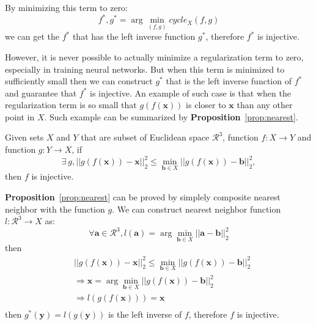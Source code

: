 By minimizing this term to zero:
\begin{equation}
f^*,g^* = \arg\min_{(f,g)} cycle_X(f,g)
\end{equation}
we can get the $f^*$ that has the left inverse function $g^*$, therefore $f^*$ is injective. 

However, it is never possible to actually minimize a regularization term to zero, especially in training neural networks. But when this term is minimized to sufficiently small then we can construct $g^*$ that is the left inverse function of $f^*$ and guarantee that $f^*$ is injective. An example of such case is that when the regularization term is so small that $g(f(\mathbf{x}))$ is closer to $\mathbf{x}$ than any other point in $X$. Such example can be summarized by \textbf{Proposition}~\ref{prop:nearest}.

\begin{m_prop}
	\label{prop:nearest}
	Given sets $X$ and $Y$ that are subset of Euclidean space $\mathcal{R}^3$, function $f:X \rightarrow Y$  and function $g:Y \rightarrow X$, if
	\begin{equation}
	\exists~g, || g(f(\mathbf{x})) - \mathbf{x} ||_2^2 \leq \min_{\mathbf{b} \in X}|| g(f(\mathbf{x})) - \mathbf{b} ||_2^2,
	\end{equation}
	then $f$ is injective.
\end{m_prop}

\textbf{Proposition}~\ref{prop:nearest} can be proved by simplely composite nearest neighbor with the function $g$. We can construct nearest neighbor function $l: \mathcal{R}^3 \rightarrow X $ as:
\begin{equation}
\forall \mathbf{a} \in \mathcal{R}^3, l(\mathbf{a}) = \arg\min_{\mathbf{b} \in X} || \mathbf{a} - \mathbf{b} ||_2^2
\end{equation}
then
\begin{equation}
\begin{aligned}
&|| g(f(\mathbf{x})) - \mathbf{x} ||_2^2 \leq \min_{\mathbf{b} \in X}|| g(f(\mathbf{x})) - \mathbf{b} ||_2^2\\
&\Rightarrow \mathbf{x} = \arg\min_{\mathbf{b} \in X}|| g(f(\mathbf{x})) - \mathbf{b} ||_2^2\\
&\Rightarrow l(g(f(\mathbf{x}))) = \mathbf{x}\\
\end{aligned}
\end{equation}
then $g^*(\mathbf{y}) = l(g(\mathbf{y}))$ is the left inverse of $f$, therefore $f$ is injective.

